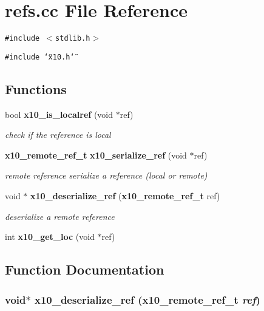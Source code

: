 \section{refs.cc File Reference}
\label{refs_8cc}
{\tt \#include $<$stdlib.h$>$}\par
{\tt \#include \char`\"{}x10.h\char`\"{}}\par
\subsection*{Functions}
\begin{CompactItemize}
\item 
bool {\bf x10\_\-is\_\-localref} (void $\ast$ref)
\begin{CompactList}\small\item\em check if the reference is local \item\end{CompactList}\item 
{\bf x10\_\-remote\_\-ref\_\-t} {\bf x10\_\-serialize\_\-ref} (void $\ast$ref)
\begin{CompactList}\small\item\em remote reference serialize a reference (local or remote) \item\end{CompactList}\item 
void $\ast$ {\bf x10\_\-deserialize\_\-ref} ({\bf x10\_\-remote\_\-ref\_\-t} ref)
\begin{CompactList}\small\item\em deserialize a remote reference \item\end{CompactList}\item 
int {\bf x10\_\-get\_\-loc} (void $\ast$ref)
\end{CompactItemize}


\subsection{Function Documentation}
\subsubsection{\setlength{\rightskip}{0pt plus 5cm}void$\ast$ x10\_\-deserialize\_\-ref ({\bf x10\_\-remote\_\-ref\_\-t} {\em ref})}\label{refs_8cc_a2}


